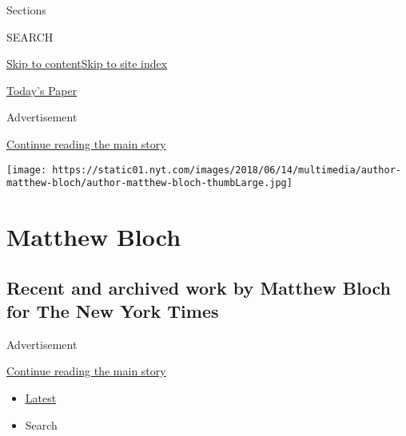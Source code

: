 Sections

SEARCH

\protect\hyperlink{site-content}{Skip to
content}\protect\hyperlink{site-index}{Skip to site index}

\href{https://myaccount.nytimes.com/auth/login?response_type=cookie\&client_id=vi}{}

\href{https://www.nytimes.com/section/todayspaper}{Today's Paper}

Advertisement

\protect\hyperlink{after-top}{Continue reading the main story}

\texttt{[image: https://static01.nyt.com/images/2018/06/14/multimedia/author-matthew-bloch/author-matthew-bloch-thumbLarge.jpg]}

\hypertarget{matthew-bloch}{%
\section{Matthew Bloch}\label{matthew-bloch}}

\hypertarget{recent-and-archived-work-by-matthew-bloch-for-the-new-york-times}{%
\subsection{Recent and archived work by Matthew Bloch for The New York
Times}\label{recent-and-archived-work-by-matthew-bloch-for-the-new-york-times}}

Advertisement

\protect\hyperlink{after-mid1}{Continue reading the main story}

\begin{itemize}
\tightlist
\item
  \protect\hyperlink{stream-panel}{Latest}
\item
  Search
\end{itemize}

